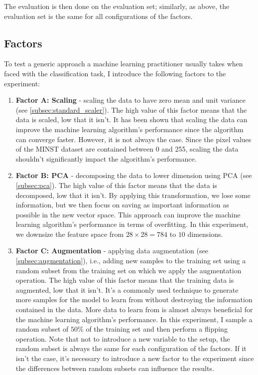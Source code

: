 \documentclass{article}
\begin{document}
The evaluation is then done on the evaluation set; similarly, as above, the evaluation set is the same for all configurations of the factors.

\subsection{Factors}
To test a generic approach a machine learning practitioner usually takes when faced with the classification task, I introduce the following factors to the experiment:
\begin{enumerate}
    \item \textbf{Factor A: Scaling} - scaling the data to have zero mean and unit variance (see \ref{subsec:standard_scaler}). The high value of this factor means that the data is scaled, low that it isn't. It has been shown that scaling the data can improve the machine learning algorithm's performance since the algorithm can converge faster. However, it is not always the case. Since the pixel values of the MINST dataset are contained between 0 and 255, scaling the data shouldn't significantly impact the algorithm's performance.
    \item \textbf{Factor B: PCA} - decomposing the data to lower dimension using PCA (see \ref{subsec:pca}). The high value of this factor means that the data is decomposed, low that it isn't. By applying this transformation, we lose some information, but we then focus on saving as important information as possible in the new vector space. This approach can improve the machine learning algorithm's performance in terms of overfitting. In this experiment, we downsize the feature space from $28\times28=784$ to $10$ dimensions.
    \item \textbf{Factor C: Augmentation} - applying data augmentation (see \ref{subsec:augmentation}), i.e., adding new samples to the training set using a random subset from the training set on which we apply the augmentation operation. The high value of this factor means that the training data is augmented, low that it isn't. It's a commonly used technique to generate more samples for the model to learn from without destroying the information contained in the data. More data to learn from is almost always beneficial for the machine learning algorithm's performance. In this experiment, I sample a random subset of $50\%$ of the training set and then perform a flipping operation. Note that not to introduce a new variable to the setup, the random subset is always the same for each configuration of the factors. If it isn't the case, it's necessary to introduce a new factor to the experiment since the differences between random subsets can influence the results.

\end{enumerate}
\end{document}

